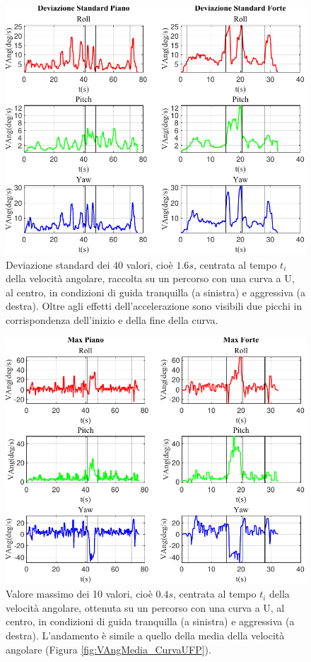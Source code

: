 \documentclass[class=article]{standalone}
\begin{document}
	\begin{center}
		\begin{figure}[h!]
			\centering\includegraphics[width=.7\textwidth]{img/CurvaUFP/VAng/Deviazione Standard}
			\caption[]{Deviazione standard dei 40 valori, cioè \(1.6s\), centrata al tempo \(t_{i}\) della velocità angolare, raccolta su un percorso con una curva a U, al centro, in condizioni di guida tranquilla (a sinistra) e aggressiva (a destra). Oltre agli effetti dell'accelerazione sono visibili due picchi in corrispondenza dell'inizio e della fine della curva.}
			\label{fig:VAngStd_CurvaUFP}
		\end{figure}
	\end{center}
	
	\begin{center}
		\begin{figure}[h!]
			\centering\includegraphics[width=.7\textwidth]{img/CurvaUFP/VAng/Max}
			\caption[]{Valore massimo dei 10 valori, cioè \(0.4s\), centrata al tempo \(t_{i}\) della velocità angolare, ottenuta su un percorso con una curva a U, al centro, in condizioni di guida tranquilla (a sinistra) e aggressiva (a destra). L'andamento è simile a quello della media della velocità angolare (Figura \ref{fig:VAngMedia_CurvaUFP}).}
			\label{fig:VAngMax_CurvaUFP}
		\end{figure}
	\end{center}
	
\end{document}
